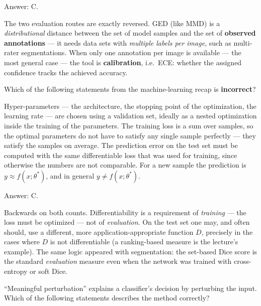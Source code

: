 \documentclass[11pt]{exam}
\begin{document}
\begin{questions}
\begin{solution}
  Answer: C.

  The two evaluation routes are exactly reversed. GED (like MMD) is a \emph{distributional}
  distance between the set of model samples and the set of \textbf{observed annotations} --- it
  needs data sets with \emph{multiple labels per image}, such as multi-rater segmentations. When
  only one annotation per image is available --- the most general case --- the tool is
  \textbf{calibration}, i.e.\ ECE: whether the assigned confidence tracks the achieved accuracy.
\end{solution}

\question
Which of the following statements from the machine-learning recap is \textbf{incorrect}?

\begin{choices}
  \choice Hyper-parameters --- the architecture, the stopping point of the optimization, the
  learning rate --- are chosen using a validation set, ideally as a nested optimization inside the
  training of the parameters.
  \choice The training loss is a sum over samples, so the optimal parameters do not have to satisfy
  any single sample perfectly --- they satisfy the samples on average.
  \choice The prediction error on the test set must be computed with the same differentiable loss
  that was used for training, since otherwise the numbers are not comparable.
  \choice For a new sample the prediction is $y \approx f(x; \theta^*)$, and in general
  $y \neq f(x; \theta^*)$.
\end{choices}

\begin{solution}
  Answer: C.

  Backwards on both counts. Differentiability is a requirement of \emph{training} --- the loss must
  be optimized --- not of \emph{evaluation}. On the test set one may, and often should, use a
  different, more application-appropriate function $D$, precisely in the cases where $D$ is not
  differentiable (a ranking-based measure is the lecture's example). The same logic appeared with
  segmentation: the set-based Dice score is the standard \emph{evaluation} measure even when the
  network was trained with cross-entropy or soft Dice.
\end{solution}

\question
``Meaningful perturbation'' explains a classifier's decision by perturbing the input. Which of the
following statements describes the method correctly?


\end{questions}
\end{document}
